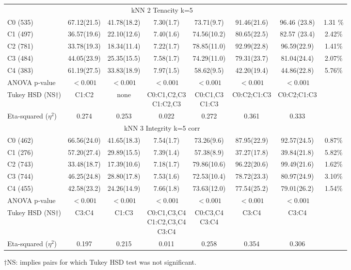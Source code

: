 \documentclass{bmcart}
\begin{document}
\begin{table}[tbp]
{\begin{tabular}{l|ccccccc}
\hline

\multicolumn{7}{c}{\rule{0pt}{3ex}kNN 2 Tenacity k=5}  \\                                                                                  C0 (535)  &67.12(21.5)    &41.78(18.2)   &7.30(1.7)  &73.71(9.7)	  &91.46(21.6)	  &96.46 (23.8)	  &1.31 \%\\
C1 (497)	&36.57(19.6)	&22.10(12.6)	&7.40(1.6)	&74.56(10.2)	&80.65(22.5)	&82.57 (23.4)	&2.42\%\\
C2 (781)	&33.78(19.3)	&18.34(11.4)	&7.22(1.7)	&78.85(11.0)	&92.99(22.8)	&96.59(22.9)	&1.41\%\\
C3 (484)	&44.05(23.9)	&25.35(15.5)	&7.58(1.7)	&74.29(11.0)	&79.31(23.7)	&81.04(24.4)	&2.07\%\\
C4 (383)	&61.19(27.5)	&33.83(18.9)	&7.97(1.5)	&58.62(9.5) 	&42.20(19.4)	&44.86(22.8)	&5.76\%\\
ANOVA p-value & $<0.001$ & $<0.001$ & $<0.001$ & $<0.001$ & $<0.001$ & $<0.001$\\
Tukey HSD (NS$\dagger$) &C1:C2 & none &\makecell{C0:C1,C2,C3\\C1:C2,C3}
&\makecell{C0:C1,C3\\C1:C3}&C0:C2;C1:C3&C0:C2;C1:C3\\
Eta-squared ($\eta^2$) & 0.274	&0.253	&0.022 &	0.272&	0.361 &0.333
\\
\hline
\multicolumn{7}{c}{\rule{0pt}{3ex}kNN 3 Integrity k=5 corr}                         \\                                                   
C0 (462)	&66.56(24.0)	&41.65(18.3)	&7.54(1.7)	&73.26(9.6)	&87.95(22.9)	&92.57(24.5)		&0.87\%\\
C1 (276)	&57.20(27.4)	&29.89(15.5)	&7.39(1.4)	&57.38(8.9)	&37.27(17.8)	&39.84(21.8)		&5.82\%\\
C2 (743)	&33.48(18.7)	&17.39(10.6)	&7.18(1.7)	&79.86(10.6)	&96.22(20.6)	&99.49(21.6)		&1.62\%\\
C3 (744)	&46.25(24.8)	&28.80(17.8)	&7.53(1.6)	&72.53(10.4)	&78.72(23.3)	&80.97(24.9)		&3.10\%\\
C4 (455)	&42.58(23.2)	&24.26(14.9)	&7.66(1.8)	&73.63(12.0)	&77.54(25.2)	&79.01(26.2)		&1.54\%\\ 
ANOVA p-value & $<0.001$ & $<0.001$ & $<0.001$ & $<0.001$ & $<0.001$ & $<0.001$\\				
Tukey HSD (NS$\dagger$) &C3:C4&C1:C3& \makecell{ C0:C1,C3,C4\\C1:C2,C3,C4\\C3:C4}& \makecell{C0:C3,C4\\C3:C4}&C3:C4&C3:C4\\				
Eta-squared ($\eta^2$) & 0.197& 0.215 & 0.011& 0.258 & 0.354 & 0.306  & \\				
\hline

\end{tabular}
}%
\begin{tablenotes}\footnotesize
\item $\dagger$NS: implies pairs for which Tukey HSD test was not significant.

\end{tablenotes}
\end{table}
\end{document}
